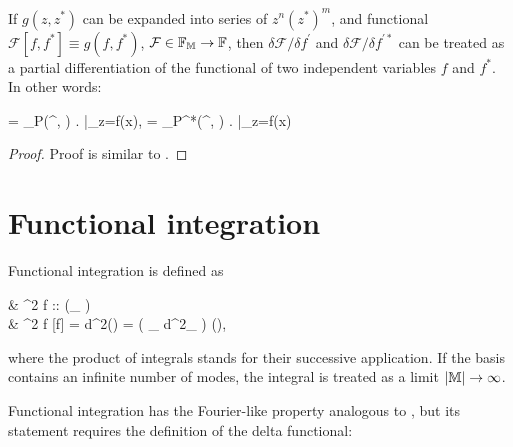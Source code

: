 \begin{lemma}
	If $g(z, z^*)$ can be expanded into series of $z^n (z^*)^m$, and functional $\mathcal{F}[f, f^*] \equiv g(f, f^*)$, $\mathcal{F} \in \mathbb{F}_{\mathbb{M}} \rightarrow \mathbb{F}$, then $\delta \mathcal{F} / \delta f^\prime$ and $\delta \mathcal{F} / \delta f^{\prime*}$ can be treated as a partial differentiation of the functional of two independent variables $f$ and $f^*$.
	In other words:
	\begin{eqn*}
		= \delta_P(\xvec^\prime, \xvec) \left.
		\right|_{z=f(x)},
		\quad
		= \delta_P^*(\xvec^\prime, \xvec) \left.
		\right|_{z=f(x)}
	\end{eqn*}
\end{lemma}
\begin{proof}
Proof is similar to .
\end{proof}


\section{Functional integration}

Functional integration is defined as

\begin{definition}
	\begin{eqn*}
		& \int \delta^2 f :: (_{\restbasis} \rightarrow {}) \rightarrow \mathbb{C} \\
		& \int \delta^2 f \mathcal{F}[f]
		= \int d^2\balpha {}(\balpha)
		= \left(
			\prod_{\nvec \in \restbasis} \int d^2\alpha_{\nvec}
		\right) (\balpha),
	\end{eqn*}
	where the product of integrals stands for their successive application.
    If the basis contains an infinite number of modes, the integral is treated as a limit $|\mathbb{M}| \rightarrow \infty$.
\end{definition}

Functional integration has the Fourier-like property analogous to , but its statement requires the definition of the delta functional:


